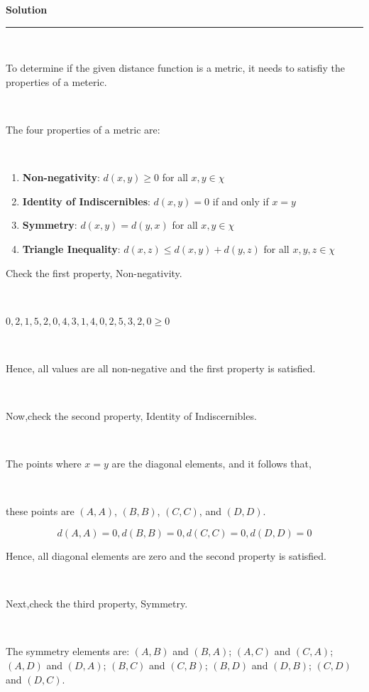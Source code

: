 \documentclass{article}
\begin{document}
\textbf{Solution}

\noindent\rule{\textwidth}{0.4pt}\\

\parbox{\textwidth}{To determine if the given distance function is a metric, it needs to satisfiy the properties of a meteric.}\\

\parbox{\textwidth}{The four properties of a metric are:}\\

\begin{enumerate}
    \item \textbf{Non-negativity}: $d(x,y) \geq 0$ for all $x,y \in \chi$
    \item \textbf{Identity of Indiscernibles}: $d(x,y) = 0$ if and only if $x = y$
    \item \textbf{Symmetry}: $d(x,y) = d(y,x)$ for all $x,y \in \chi$
    \item \textbf{Triangle Inequality}: $d(x,z) \leq d(x,y) + d(y,z)$ for all $x,y,z \in \chi$
\end{enumerate}

\parbox{\textwidth}{Check the first property, Non-negativity.}\\

\parbox{\textwidth}{$0,2,1,5,2,0,4,3,1,4,0,2,5,3,2,0 \geq 0$}\\

\parbox{\textwidth}{Hence, all values are all non-negative and the first property is satisfied.}\\

\parbox{\textwidth}{Now,check the second property, Identity of Indiscernibles.}\\

\parbox{\textwidth}{The points where $x=y$ are the diagonal elements, and it follows that,}\\

\parbox{\textwidth}{these points are $(A,A)$, $(B,B)$, $(C,C)$, and $(D,D)$.}

$$d(A,A) = 0 , d(B,B) = 0 , d(C,C) = 0 , d(D,D) = 0$$

\parbox{\textwidth}{Hence, all diagonal elements are zero and the second property is satisfied.}\\

\parbox{\textwidth}{Next,check the third property, Symmetry.}\\

\parbox{\textwidth}{The symmetry elements are: $(A,B)$ and $(B,A)$; $(A,C)$ and $(C,A)$; $(A,D)$ and $(D,A)$; $(B,C)$ and $(C,B)$; $(B,D)$ and $(D,B)$; $(C,D)$ and $(D,C)$.}\\
\end{document}
